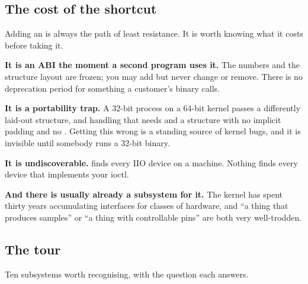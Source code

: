 \subsection{The cost of the shortcut}
\label{c11:app:a2}

Adding an  is always the path of least resistance. It is worth knowing what it costs
before taking it.

\textbf{It is an ABI the moment a second program uses it.} The numbers and the structure layout are
frozen; you may add but never change or remove. There is no deprecation period for something a
customer's binary calls.

\textbf{It is a portability trap.} A 32-bit process on a 64-bit kernel passes a differently laid-out
structure, and handling that needs  and a structure with no implicit padding and
no . Getting this wrong is a standing source of kernel bugs, and it is invisible until
somebody runs a 32-bit binary.

\textbf{It is undiscoverable.}  finds every IIO device on a machine.
Nothing finds every device that implements your ioctl.

\textbf{And there is usually already a subsystem for it.} The kernel has spent thirty years
accumulating interfaces for classes of hardware, and ``a thing that produces samples'' or ``a thing
with controllable pins'' are both very well-trodden.

\subsection{The tour}
\label{c11:app:a3}

Ten subsystems worth recognising, with the question each answers.


